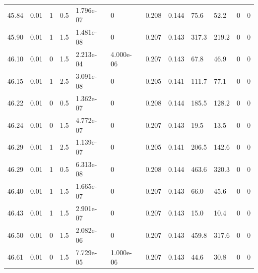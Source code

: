 \documentclass[preview]{standalone}
\begin{document}
{{{{{{{{{{{{{{\begin{tabular}{L{1.2cm}C{1.2cm} C{0.3cm}C{0.5cm} C{1.4cm}C{1.4cm} C{1.4cm}C{1.4cm} C{1.6cm}C{1.6cm} C{1.6cm}C{1.6cm}}
  45.84  &  0.01  & 1     & 0.5 &  1.796e-07  & 0  &  0.208&   0.144& 75.6 & 52.2   &  0 & 0  \\ 
  45.90  &  0.01  & 1     & 1.5 &  1.481e-08  & 0  &  0.207&   0.143& 317.3 & 219.2   &  0 & 0  \\ 
  46.10  &  0.01  & 0     & 1.5 &  2.213e-04  & 4.000e-06  &  0.207&   0.143& 67.8 & 46.9   &  0 & 0  \\ 
  46.15  &  0.01  & 1     & 2.5 &  3.091e-08  & 0  &  0.205&   0.141& 111.7 & 77.1   &  0 & 0  \\ 
  46.22  &  0.01  & 0     & 0.5 &  1.362e-07  & 0  &  0.208&   0.144& 185.5 & 128.2   &  0 & 0  \\ 
  46.24  &  0.01  & 0     & 1.5 &  4.772e-07  & 0  &  0.207&   0.143& 19.5 & 13.5   &  0 & 0  \\ 
  46.29  &  0.01  & 1     & 2.5 &  1.139e-07  & 0  &  0.205&   0.141& 206.5 & 142.6   &  0 & 0  \\ 
  46.29  &  0.01  & 1     & 0.5 &  6.313e-08  & 0  &  0.208&   0.144& 463.6 & 320.3   &  0 & 0  \\ 
  46.40  &  0.01  & 1     & 1.5 &  1.665e-07  & 0  &  0.207&   0.143& 66.0 & 45.6   &  0 & 0  \\ 
  46.43  &  0.01  & 1     & 1.5 &  2.901e-07  & 0  &  0.207&   0.143& 15.0 & 10.4   &  0 & 0  \\ 
  46.50  &  0.01  & 0     & 1.5 &  2.082e-06  & 0  &  0.207&   0.143& 459.8 & 317.6   &  0 & 0  \\ 
  46.61  &  0.01  & 0     & 1.5 &  7.729e-05  & 1.000e-06  &  0.207&   0.143& 44.6 & 30.8   &  0 & 0  \\ 
\hline 
\end{tabular} 

}}}}}}}}}}}}}}
\end{document}
